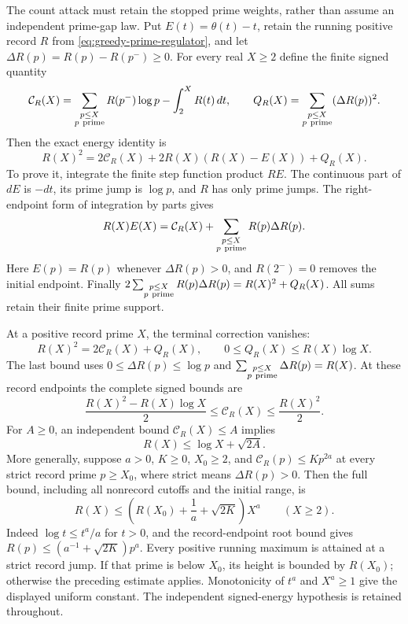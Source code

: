 \documentclass[11pt]{article}
\theoremstyle{definition}
\begin{document}
The count attack must retain the stopped prime weights,
rather than assume an independent prime-gap law.
Put $E(t)=\theta(t)-t$, retain the running positive record
$R$ from \eqref{eq:greedy-prime-regulator}, and let
$\Delta R(p)=R(p)-R(p^-)\ge0$.
For every real $X\ge2$ define the finite signed quantity
\[
 \mathcal C_R(X)=
   \sum_{\substack{p\le X\\p\ {\rm prime}}}R(p^-)\log p
                              -\int_2^X R(t)\,dt,
 \qquad
 Q_R(X)=\sum_{\substack{p\le X\\p\ {\rm prime}}}(\Delta R(p))^2 .
\]
Then the exact energy identity is
\begin{equation}
 R(X)^2=2\mathcal C_R(X)+2R(X)(R(X)-E(X))+Q_R(X).
 \label{eq:prime-record-energy}
\end{equation}
To prove it, integrate the finite step function product $RE$.
The continuous part of $dE$ is $-dt$, its prime jump is
$\log p$, and $R$ has only prime jumps.
The right-endpoint form of integration by parts gives
\[
 R(X)E(X)=\mathcal C_R(X)+
       \sum_{\substack{p\le X\\p\ {\rm prime}}}R(p)\Delta R(p).
\]
Here $E(p)=R(p)$ whenever $\Delta R(p)>0$, and
$R(2^-)=0$ removes the initial endpoint.
Finally
\(2\sum_{\substack{p\le X\\p\ {\rm prime}}}
       R(p)\Delta R(p)=R(X)^2+Q_R(X)\).
All sums retain their finite prime support.

At a positive record prime $X$, the terminal correction vanishes:
\begin{equation}
 R(X)^2=2\mathcal C_R(X)+Q_R(X),
 \qquad 0\le Q_R(X)\le R(X)\log X.
 \label{eq:prime-record-energy-at-record}
\end{equation}
The last bound uses \(0\le\Delta R(p)\le\log p\) and
\(\sum_{\substack{p\le X\\p\ {\rm prime}}}\Delta R(p)=R(X)\).
At these record endpoints the complete signed bounds are
\[
 \frac{R(X)^2-R(X)\log X}{2}\le\mathcal C_R(X)
                                      \le\frac{R(X)^2}{2}.
\]
For \(A\ge0\), an independent bound \(\mathcal C_R(X)\le A\) implies
\[
 R(X)\le\log X+\sqrt{2A}.
\]
More generally, suppose \(a>0\), \(K\ge0\), \(X_0\ge2\), and
\(\mathcal C_R(p)\le Kp^{2a}\) at every strict record prime
\(p\ge X_0\), where strict means \(\Delta R(p)>0\).
Then the full bound, including all nonrecord cutoffs and the initial
range, is
\[
 R(X)\le
   \left(R(X_0)+\frac1a+\sqrt{2K}\right)X^a
                         \qquad(X\ge2).
\]
Indeed \(\log t\le t^a/a\) for \(t>0\), and the record-endpoint
root bound gives \(R(p)\le(a^{-1}+\sqrt{2K})p^a\).
Every positive running maximum is attained at a strict record jump.
If that prime is below \(X_0\), its height is bounded by \(R(X_0)\);
otherwise the preceding estimate applies. Monotonicity of \(t^a\)
and \(X^a\ge1\) give the displayed uniform constant.
The independent signed-energy hypothesis is retained throughout.
\end{document}
